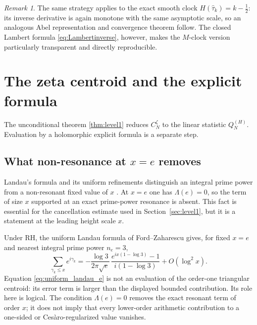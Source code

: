 \documentclass[11pt]{amsart}
\numberwithin{equation}{section}
\theoremstyle{definition}
\theoremstyle{remark}
\newtheorem{remark}[theorem]{Remark}
\begin{document}
\begin{remark}
The same strategy applies to the exact smooth clock $H(\widehat\tau_k)=k-\tfrac12$: its inverse derivative is again monotone with the same asymptotic scale, so an analogous Abel representation and convergence theorem follow. The closed Lambert formula \eqref{eq:Lambertinverse}, however, makes the $M$-clock version particularly transparent and directly reproducible.
\end{remark}

\section{The zeta centroid and the explicit formula}\label{sec:explicit}

The unconditional theorem \ref{thm:level1} reduces $C_N^{\zeta}$ to the linear statistic $Q_N^{(H)}$. Evaluation by a holomorphic explicit formula is a separate step.

\subsection{What non-resonance at $x=e$ removes}\label{subsec:nonresonance}
Landau's formula and its uniform refinements distinguish an integral prime power from a non-resonant fixed value of $x$ \cite{Landau1912,Gonek1993,FordZaharescu2005}. At $x=e$ one has $\Lambda(e)=0$, so the term of size $x$ supported at an exact prime-power resonance is absent. This fact is essential for the cancellation estimate used in Section~\ref{sec:level1}, but it is a statement at the leading height scale $x$.

Under RH, the uniform Landau formula of Ford--Zaharescu gives, for fixed $x=e$ and nearest integral prime power $n_e=3$,
\begin{equation}\label{eq:uniform_landau_e}
\sum_{\gamma_k\leq x}e^{i\gamma_k}
=-\frac{\log3}{2\pi\sqrt e}\,
\frac{e^{ix(1-\log3)}-1}{i(1-\log3)}
+O(\log^2 x).
\end{equation}
Equation \eqref{eq:uniform_landau_e} is not an evaluation of the order-one triangular centroid: its error term is larger than the displayed bounded contribution. Its role here is logical. The condition $\Lambda(e)=0$ removes the exact resonant term of order $x$; it does not imply that every lower-order arithmetic contribution to a one-sided or Cesàro-regularized value vanishes.
\end{document}
